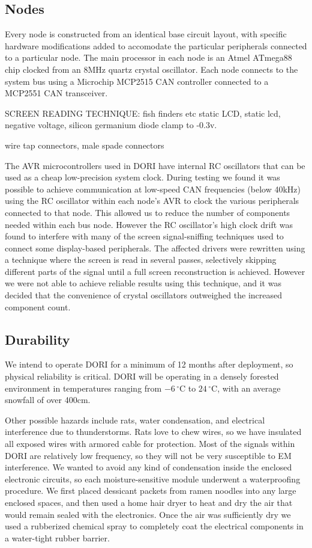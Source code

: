 \documentclass[12pt]{article}
\newcommand{\degrees}{\,^{\circ}\mathrm{C}}
\begin{document}
    \subsection{Nodes}
    Every node is constructed from an identical base circuit layout, with specific hardware modifications added to accomodate the particular peripherals connected to a particular node. The main processor in each node is an Atmel ATmega88 chip clocked from an 8MHz quartz crystal oscillator. Each node connects to the system bus using a Microchip MCP2515 CAN controller connected to a MCP2551 CAN transceiver.

    SCREEN READING TECHNIQUE: fish finders  etc static LCD, 
static lcd, negative voltage, silicon germanium diode clamp to -0.3v.

    wire tap connectors, male spade connectors

The AVR microcontrollers used in DORI have internal RC oscillators that can be used as a cheap low-precision system clock. During testing we found it was possible to achieve communication at low-speed CAN frequencies (below 40kHz) using the RC oscillator within each node's AVR to clock the various peripherals connected to that node. This allowed us to reduce the number of components needed within each bus node. However the RC oscillator's high clock drift was found to interfere with many of the screen signal-sniffing techniques used to connect some display-based peripherals. The affected drivers were rewritten using a technique where the screen is read in several passes, selectively skipping different parts of the signal until a full screen reconstruction is achieved. However we were not able to achieve reliable results using this technique, and it was decided that the convenience of crystal oscillators outweighed the increased component count.

    \subsection{Durability}
We intend to operate \textsc{DORI} for a minimum of 12 months after deployment, so physical reliability is critical. \textsc{DORI} will be operating in a densely forested environment in temperatures ranging from $-6\degrees{}$ to $24\degrees{}$, with an average snowfall of over 400cm.

Other possible hazards include rats, water condensation, and electrical interference due to thunderstorms. Rats love to chew wires, so we have insulated all exposed wires with armored cable for protection. Most of the signals within \textsc{DORI} are relatively low frequency, so they will not be very susceptible to EM interference. We wanted to avoid any kind of condensation inside the enclosed electronic circuits, so each moisture-sensitive module underwent a waterproofing procedure. We first placed dessicant packets from ramen noodles into any large enclosed spaces, and then used a home hair dryer to heat and dry the air that would remain sealed with the electronics. Once the air was sufficiently dry we used a rubberized chemical spray to completely coat the electrical components in a water-tight rubber barrier.
\end{document}
